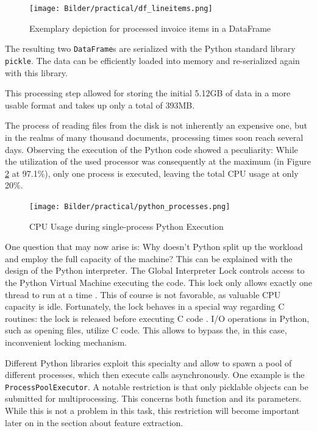 	\begin{figure}[ht]
		\centering
		\texttt{[image: Bilder/practical/df\_lineitems.png]}
		\caption{Exemplary depiction for processed invoice items in a DataFrame}
		\label{fig:df-invoice}
	\end{figure}
	
	The resulting two \lstinline|DataFrame|s are serialized with the Python standard library \lstinline|pickle|. The data can be efficiently loaded into memory and re-serialized again with this library.
	
	This processing step allowed for storing the initial 5.12GB of data in a more usable format and takes up only a total of 393MB.

	The process of reading files from the disk is not inherently an expensive one, but in the realms of many thousand documents, processing times soon reach several days. Observing the execution of the Python code showed a peculiarity: While the utilization of the used processor was consequently at the maximum (in Figure \ref{fig:cpu} at 97.1\%), only one process is executed, leaving the total \ac{CPU} usage at only 20\%. 
	
	\begin{figure}[ht]
		\centering
		\texttt{[image: Bilder/practical/python\_processes.png]}
		\caption{\acs{CPU} Usage during single-process Python Execution}
		\label{fig:cpu}
	\end{figure}
	
	
	One question that may now arise is: Why doesn't Python split up the workload and employ the full capacity of the machine?
	This can be explained with the design of the Python interpreter. The Global Interpreter Lock controls access to the Python Virtual Machine executing the code. This lock only allows exactly one thread to run at a time \cite{corePython}. This of course is not favorable, as valuable CPU capacity is idle. Fortunately, the lock behaves in a special way regarding C routines: the lock is released before executing C code \cite{corePython}. I/O operations in Python, such as opening files, utilize C code. This allows to bypass the, in this case, inconvenient locking mechanism. 
	
	Different Python libraries exploit this specialty and allow to spawn a pool of different processes, which then execute calls asynchronously. One example is the \lstinline|ProcessPoolExecutor|. A notable restriction is that only picklable objects can be submitted for multiprocessing. This concerns both function and its parameters. While this is not a problem in this task, this restriction will become important later on in the section about feature extraction.
	

